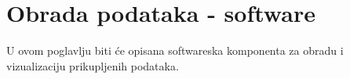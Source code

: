 \chapter{Obrada podataka - software}
U ovom poglavlju biti će opisana softwareska komponenta za obradu i vizualizaciju prikupljenih podataka.




